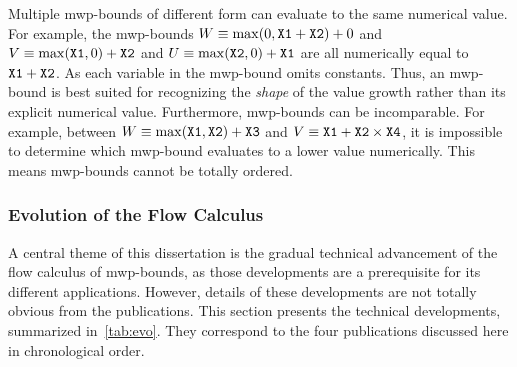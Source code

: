 \noindent Multiple mwp-bounds of different form can evaluate to the same numerical value.
For example, the mwp-bounds
\(W \equiv \max(0,\prm{X1}+\prm{X2})+0\) and
\(V \equiv \max(\prm{X1},0)+\prm{X2}\) and
\(U \equiv \max(\prm{X2},0)+\prm{X1}\) are all numerically equal to \(\prm{X1}+\prm{X2}\).
As each variable in the mwp-bound omits constants.
Thus, an mwp-bound is best suited for recognizing the \emph{shape} of the value growth rather than its explicit numerical value.
Furthermore, mwp-bounds can be incomparable.
For example, between \(W \equiv \max(\prm{X1},\prm{X2})+\prm{X3}\) and \(V \equiv \prm{X1}+\prm{X2}\times\prm{X4}\), it is impossible to determine which mwp-bound evaluates to a lower value numerically.
This means mwp-bounds cannot be totally ordered.

\subsubsection{Evolution of the Flow Calculus}

A central theme of this dissertation is the gradual technical advancement of the flow calculus of mwp-bounds, as those developments are a prerequisite for its different applications.
However, details of these developments are not totally obvious from the publications.
This section presents the technical developments, summarized in~\autoref{tab:evo}.
They correspond to the four publications discussed here in chronological order.

